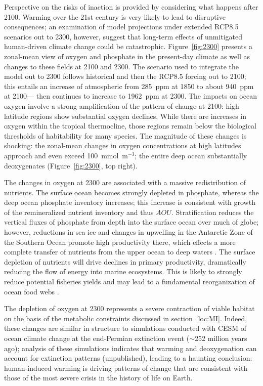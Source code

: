 \documentclass[draft,linenumbers]{report_chapter}
\begin{document}
Perspective on the risks of inaction is provided by considering what happens after 2100.
Warming over the 21st century is very likely to lead to disruptive consequences; an examination of model projections under extended RCP8.5 scenarios out to 2300, however, suggest that long-term effects of unmitigated human-driven climate change could be catastrophic.
Figure~\ref{fig:2300} presents a zonal-mean view of oxygen and phosphate in the present-day climate as well as changes to these fields at 2100 and 2300.
The scenario used to integrate the model out to 2300 follows historical and then the RCP8.5 forcing out to 2100; this entails an increase of atmospheric  from 285~ppm at 1850 to about 940~ppm at 2100--- then continues to increase to 1962~ppm at 2300.
The impacts on ocean oxygen involve a strong amplification of the pattern of change at 2100: high latitude regions show substantial oxygen declines.  While there are increases in oxygen within the tropical thermocline, those regions remain below the biological thresholds of habitability for many species.
The magnitude of these changes is shocking: the zonal-mean changes in oxygen concentrations at high latitudes approach and even exceed 100~mmol~m$^{-3}$; the entire deep ocean substantially deoxygenates (Figure~\ref{fig:2300}, top right).

The changes in oxygen at 2300 are associated with a massive redistribution of nutrients.
The surface ocean becomes strongly depleted in phosphate, whereas the deep ocean phosphate inventory increases; this increase is consistent with growth of the remineralized nutrient inventory and thus $AOU$.
Stratification reduces the vertical fluxes of phosphate from depth into the surface ocean over much of globe; however, reductions in sea ice and changes in upwelling in the Antarctic Zone of the Southern Ocean promote high productivity there, which effects a more complete transfer of nutrients from the upper ocean to deep waters \citep{Primeau-Holzer-etal-2013}.
The surface depletion of nutrients will drive declines in primary productivity, dramatically reducing the flow of energy into marine ecosystems.
This is likely to strongly reduce potential fisheries yields \citep{Stock-John-etal-2017,Pauly-Christensen-1995} and may lead to a fundamental reorganization of ocean food webs \citep{Hoegh-Guldberg-Bruno-2010}.

The depletion of oxygen at 2300 represents a severe contraction of viable habitat on the basis of the metabolic constraints discussed in section~\ref{loc:MI}.
Indeed, these changes are similar in structure to simulations conducted with CESM of ocean climate change at the end-Permian extinction event ($\sim$252 million years ago); analysis of these simulations indicates that warming and deoxygenation can account for extinction patterns (unpublished), leading to a haunting conclusion: human-induced warming is driving patterns of change that are consistent with those of the most severe crisis in the history of life on Earth.
\end{document}
